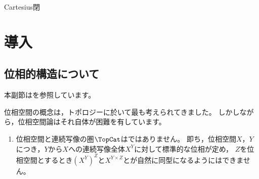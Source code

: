 \def\NewCategory#1{%
    \expandafter\def\csname #1Cat\endcsname{\mathsf{#1}}%
}
\def\NewWord#1#2{%
    \expandafter\def\csname Word#1\endcsname{#2}%
}

\NewCategory{Top}
\NewWord{CartesianClosed}{Cartesius閉}

\section{導入}
\subsection{位相的構造について}
本副節は\cite{Herrlich__1974__Topological_Structures}を参照しています。

位相空間の概念は，トポロジーに於いて最も考えられてきました。
しかしながら，位相空間論はそれ自体が困難を有しています。
\begin{enumerate}
    \item 位相空間と連続写像の圏\(\TopCat\)は\WordCartesianClosed ではありません。
        即ち，位相空間\(X\)，\(Y\)につき，\(Y\)から\(X\)への連続写像全体\(X^Y\)に対して標準的な位相が定め，
        \(Z\)を位相空間とするとき\((X^Y)^Z\)と\(X^{Y\times Z}\)とが自然に同型になるようにはできません。

\end{enumerate}